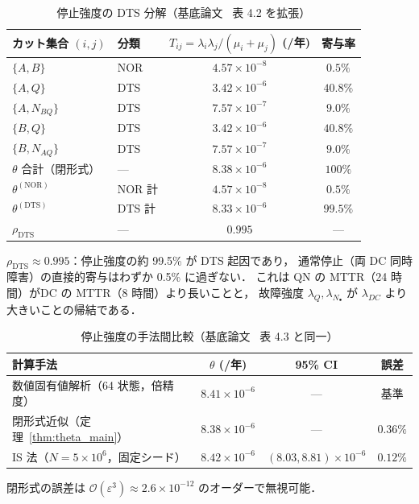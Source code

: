 \documentclass[12pt,a4paper]{article}
\theoremstyle{plain}
\theoremstyle{definition}
\theoremstyle{remark}
\newcommand{\calO}{\mathcal{O}}        %
\newcommand{\eps}{\varepsilon}         %
\newcommand{\thetaNOR}{\theta^{(\mathrm{NOR})}}
\newcommand{\thetaDTS}{\theta^{(\mathrm{DTS})}}
\newcommand{\rhoDTS}{\rho_{\mathrm{DTS}}}
\begin{document}
\begin{table}[H]
  \centering
  \caption{停止強度の DTS 分解（基底論文~\cite{habase:v7} 表 4.2 を拡張）}
  \label{tab:DTS_decomp}
  \begin{tabular}{llcc}
    \toprule
    カット集合 $(i,j)$ & 分類 &
    $T_{ij}=\lambda_i\lambda_j/(\mu_i+\mu_j)$ (/年) & 寄与率 \\
    \midrule
    $\{A,B\}$       & NOR & $4.57\times10^{-8}$ & $0.5\%$  \\
    $\{A,Q\}$       & DTS & $3.42\times10^{-6}$ & $40.8\%$ \\
    $\{A,N_{BQ}\}$  & DTS & $7.57\times10^{-7}$ & $9.0\%$  \\
    $\{B,Q\}$       & DTS & $3.42\times10^{-6}$ & $40.8\%$ \\
    $\{B,N_{AQ}\}$  & DTS & $7.57\times10^{-7}$ & $9.0\%$  \\
    \midrule
    $\theta$ 合計（閉形式） & --- & $8.38\times10^{-6}$ & $100\%$ \\
    \midrule
    $\thetaNOR$    & NOR 計 & $4.57\times10^{-8}$ & $0.5\%$  \\
    $\thetaDTS$    & DTS 計 & $8.33\times10^{-6}$ & $99.5\%$ \\
    $\rhoDTS$ & --- & $0.995$ & --- \\
    \bottomrule
  \end{tabular}
\end{table}

$\rhoDTS \approx 0.995$：停止強度の約 99.5\% が DTS 起因であり，
通常停止（両 DC 同時障害）の直接的寄与はわずか 0.5\% に過ぎない．
これは QN の MTTR（24 時間）がDC の MTTR（8 時間）より長いことと，
故障強度 $\lambda_Q,\lambda_{N_\bullet}$ が $\lambda_{DC}$ より大きいことの帰結である．

\begin{table}[H]
  \centering
  \caption{停止強度の手法間比較（基底論文~\cite{habase:v7} 表 4.3 と同一）}
  \label{tab:compare}
  \small
  \begin{tabular}{p{5.5cm}ccc}
    \toprule
    計算手法 & $\theta$ (/年) & 95\% CI & 誤差 \\
    \midrule
    数値固有値解析（64 状態，倍精度） & $8.41\times10^{-6}$ & --- & 基準 \\
    閉形式近似（定理~\ref{thm:theta_main}） & $8.38\times10^{-6}$ & --- & $0.36\%$ \\
    IS 法（$N=5\times10^6$，固定シード） & $8.42\times10^{-6}$
      & $(8.03,8.81)\times10^{-6}$ & $0.12\%$ \\
    \bottomrule
  \end{tabular}
  \vspace{2pt}
  {\small 閉形式の誤差は $\calO(\eps^3) \approx 2.6\times10^{-12}$ のオーダーで無視可能．}
\end{table}
\end{document}
